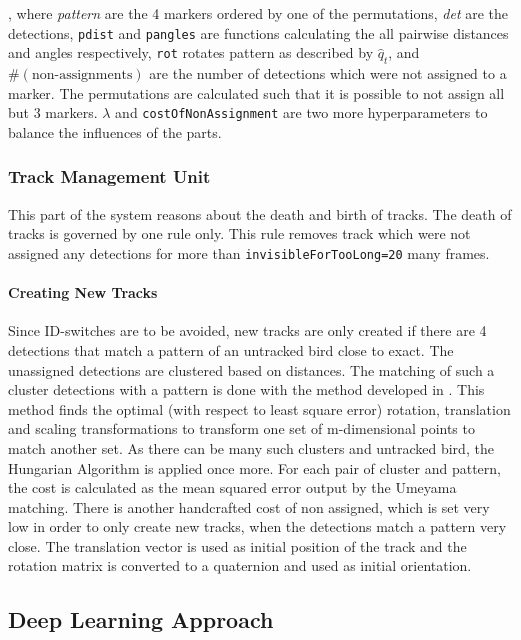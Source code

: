 \documentclass{article}
\begin{document}
, where \emph{pattern} are the 4 markers ordered by one of the permutations, \emph{det} are the detections, \texttt{pdist} and \texttt{pangles} are functions calculating the all pairwise distances and angles respectively,  \texttt{rot} rotates pattern as described by $\hat{q}_t$, and $\#(\text{non-assignments})$ are the number of detections which were not assigned to a marker. The permutations are calculated such that it is possible to not assign all but 3 markers. $\lambda$ and \texttt{costOfNonAssignment} are two more hyperparameters to balance the influences of the parts.

\subsubsection{Track Management Unit}
This part of the system reasons about the death and birth of tracks. %
The death of tracks is governed by one rule  only. This rule removes track which were not assigned any detections for more than \texttt{invisibleForTooLong=20} many frames.

\paragraph{Creating New Tracks} 
Since ID-switches are to be avoided, new tracks are only created if there are 4 detections that match a pattern of an untracked bird close to exact. The unassigned detections are clustered based on distances. The matching of such a cluster detections with a pattern is done with the method developed in \cite{umeyama}. This method finds the optimal (with respect to least square error) rotation, translation and scaling transformations to transform one set of m-dimensional points to match another set. As there can be many such clusters and untracked bird, the Hungarian Algorithm is applied once more. For each pair of cluster and pattern, the cost is calculated as the mean squared error output by the Umeyama matching. There is another handcrafted cost of non assigned, which is set very low in order to only create new tracks, when the detections match a pattern very close. The translation vector is used as initial position of the track and the rotation matrix is converted to a quaternion and used as initial orientation.




\subsection{Deep Learning Approach}
\end{document}
